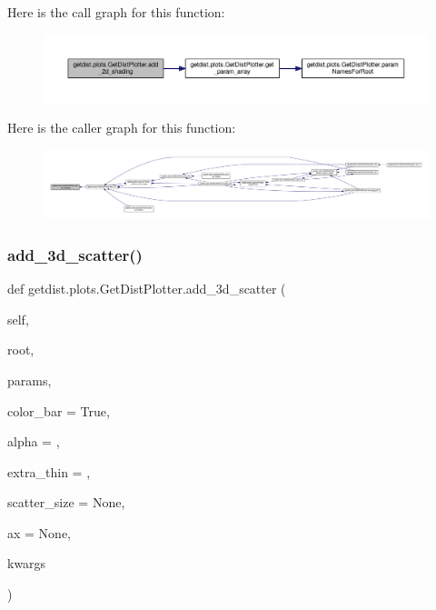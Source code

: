 Here is the call graph for this function\+:
\nopagebreak
\begin{figure}[H]
\begin{center}
\leavevmode
\includegraphics[width=350pt]{classgetdist_1_1plots_1_1GetDistPlotter_a717cc70fba7ccf459cc880e6069f964b_cgraph}
\end{center}
\end{figure}
Here is the caller graph for this function\+:
\nopagebreak
\begin{figure}[H]
\begin{center}
\leavevmode
\includegraphics[width=350pt]{classgetdist_1_1plots_1_1GetDistPlotter_a717cc70fba7ccf459cc880e6069f964b_icgraph}
\end{center}
\end{figure}
\mbox{\label{classgetdist_1_1plots_1_1GetDistPlotter_aef375df68dd9f9b2c7fa0b08ae851579}} 
\subsubsection{\texorpdfstring{add\+\_\+3d\+\_\+scatter()}{add\_3d\_scatter()}}
{\footnotesize\ttfamily def getdist.\+plots.\+Get\+Dist\+Plotter.\+add\+\_\+3d\+\_\+scatter (\begin{DoxyParamCaption}\item[{}]{self,  }\item[{}]{root,  }\item[{}]{params,  }\item[{}]{color\+\_\+bar = {\ttfamily True},  }\item[{}]{alpha = {},  }\item[{}]{extra\+\_\+thin = {},  }\item[{}]{scatter\+\_\+size = {\ttfamily None},  }\item[{}]{ax = {\ttfamily None},  }\item[{}]{kwargs }\end{DoxyParamCaption})}

